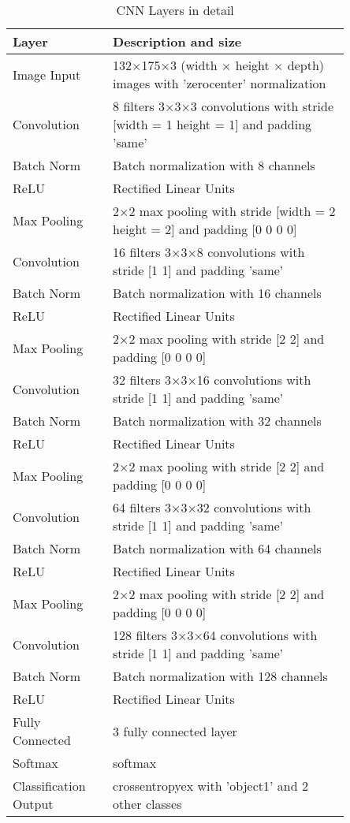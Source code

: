 \documentclass[conference]{IEEEtran}
\begin{document}
\newpage
\begin{table}[!htbp]
\centering
\caption{CNN Layers in detail}
\begin{tabularx}{0.48\textwidth}{p{0.25\linewidth} | p{0.6\linewidth}}
\hline
Layer  & Description and size  \\
\hline
 Image Input  & 132×175×3 (width × height × depth) images with 'zerocenter' normalization \\
Convolution           & 8 filters 3×3×3 convolutions with stride [width = 1  height = 1] and padding 'same' \\
Batch Norm   & Batch normalization with 8 channels \\
ReLU                  & Rectified Linear Units  \\
Max Pooling           & 2×2 max pooling with stride [width = 2  height = 2] and padding [0  0  0  0] \\
\hline
Convolution             & 16 filters 3×3×8 convolutions with stride [1  1] and padding 'same' \\
Batch Norm     & Batch normalization with 16 channels \\
ReLU                    & Rectified Linear Units  \\
Max Pooling             & 2×2 max pooling with stride [2  2] and padding [0  0  0  0] \\
\hline
Convolution             & 32 filters 3×3×16 convolutions with stride [1  1] and padding 'same' \\
Batch Norm     & Batch normalization with 32 channels \\
ReLU                    & Rectified Linear Units  \\
Max Pooling             & 2×2 max pooling with stride [2  2] and padding [0  0  0  0] \\
\hline
Convolution             & 64 filters 3×3×32 convolutions with stride [1  1] and padding 'same' \\
Batch Norm     & Batch normalization with 64 channels \\
ReLU                    & Rectified Linear Units  \\
Max Pooling             & 2×2 max pooling with stride [2  2] and padding [0  0  0  0] \\
\hline
Convolution             & 128 filters 3×3×64 convolutions with stride [1  1] and padding 'same' \\
Batch Norm     & Batch normalization with 128 channels \\
ReLU                    & Rectified Linear Units  \\
\hline
Fully Connected         & 3 fully connected layer \\
Softmax                 & softmax \\
Classification Output   & crossentropyex with 'object1' and 2 other classes \\
\hline
\end{tabularx}%
\label{table_CNN}
\end{table}
\end{document}
